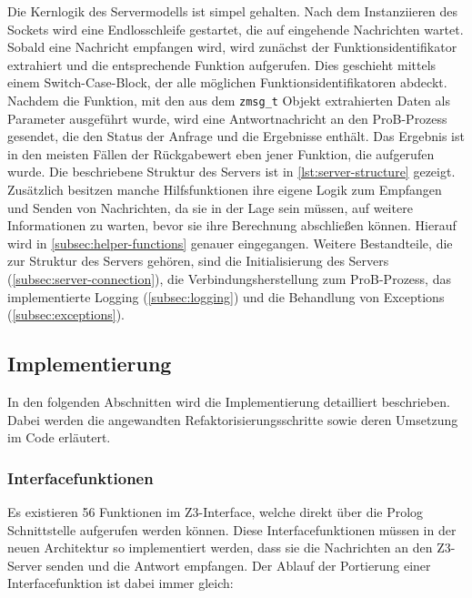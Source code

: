 Die Kernlogik des Servermodells ist simpel gehalten.
Nach dem Instanziieren des Sockets wird eine Endlosschleife gestartet, die auf eingehende Nachrichten wartet.
Sobald eine Nachricht empfangen wird, wird zunächst der Funktionsidentifikator extrahiert und die entsprechende Funktion aufgerufen.
Dies geschieht mittels einem Switch-Case-Block, der alle möglichen Funktionsidentifikatoren abdeckt.
Nachdem die Funktion, mit den aus dem \texttt{zmsg\_t} Objekt extrahierten Daten als Parameter ausgeführt wurde,
wird eine Antwortnachricht an den ProB-Prozess gesendet, die den Status der Anfrage und die Ergebnisse enthält.
Das Ergebnis ist in den meisten Fällen der Rückgabewert eben jener Funktion, die aufgerufen wurde.
Die beschriebene Struktur des Servers ist in \cref{lst:server-structure} gezeigt.
\clearpage
Zusätzlich besitzen manche Hilfsfunktionen ihre eigene Logik zum Empfangen und Senden von Nachrichten,
da sie in der Lage sein müssen, auf weitere Informationen zu warten, bevor sie ihre Berechnung abschließen können.
Hierauf wird in \cref{subsec:helper-functions} genauer eingegangen.
Weitere Bestandteile, die zur Struktur des Servers gehören, sind die Initialisierung des Servers (\cref{subsec:server-connection}), die Verbindungsherstellung zum ProB-Prozess,
das implementierte Logging (\cref{subsec:logging}) und die Behandlung von Exceptions (\cref{subsec:exceptions}).

\FloatBarrier

\subsection{Implementierung}

In den folgenden Abschnitten wird die Implementierung detailliert beschrieben.
Dabei werden die angewandten Refaktorisierungsschritte sowie deren Umsetzung im Code erläutert.




\subsubsection{Interfacefunktionen}

Es existieren 56 Funktionen im Z3-Interface, welche direkt über die Prolog Schnittstelle aufgerufen werden können.
Diese Interfacefunktionen müssen in der neuen Architektur so implementiert werden, dass sie die Nachrichten an den Z3-Server senden und die Antwort empfangen.
Der Ablauf der Portierung einer Interfacefunktion ist dabei immer gleich:

